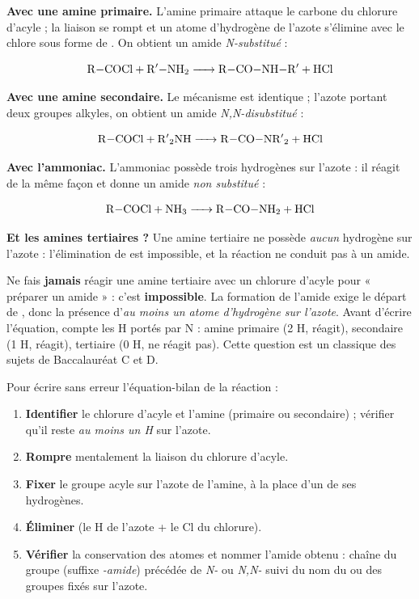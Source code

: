 \documentclass[11pt]{article}
\begin{document}
\textbf{Avec une amine primaire.} L'amine primaire  attaque le carbone du chlorure d'acyle ; la liaison  se rompt et un atome d'hydrogène de l'azote s'élimine avec le chlore sous forme de . On obtient un amide \emph{N-substitué} :

\[ \ce{R-COCl + R$'$-NH2 -> R-CO-NH-R$'$ + HCl} \]

\textbf{Avec une amine secondaire.} Le mécanisme est identique ; l'azote portant deux groupes alkyles, on obtient un amide \emph{N,N-disubstitué} :

\[ \ce{R-COCl + R$'$2NH -> R-CO-NR$'$2 + HCl} \]

\textbf{Avec l'ammoniac.} L'ammoniac  possède trois hydrogènes sur l'azote : il réagit de la même façon et donne un amide \emph{non substitué} :

\[ \ce{R-COCl + NH3 -> R-CO-NH2 + HCl} \]

\textbf{Et les amines tertiaires ?} Une amine tertiaire  ne possède \emph{aucun} hydrogène sur l'azote : l'élimination de  est impossible, et la réaction ne conduit pas à un amide.

\begin{attention}
Ne fais \textbf{jamais} réagir une amine tertiaire  avec un chlorure d'acyle pour « préparer un amide » : c'est \textbf{impossible}. La formation de l'amide exige le départ de , donc la présence d'\emph{au moins un atome d'hydrogène sur l'azote}. Avant d'écrire l'équation, compte les H portés par N : amine primaire (2 H, réagit), secondaire (1 H, réagit), tertiaire (0 H, ne réagit pas). Cette question est un classique des sujets de Baccalauréat C et D.
\end{attention}

\begin{methode}
Pour écrire sans erreur l'équation-bilan de la réaction :
\begin{enumerate}
\item \textbf{Identifier} le chlorure d'acyle  et l'amine (primaire ou secondaire) ; vérifier qu'il reste \emph{au moins un H} sur l'azote.
\item \textbf{Rompre} mentalement la liaison  du chlorure d'acyle.
\item \textbf{Fixer} le groupe acyle  sur l'azote de l'amine, à la place d'un de ses hydrogènes.
\item \textbf{Éliminer}  (le H de l'azote + le Cl du chlorure).
\item \textbf{Vérifier} la conservation des atomes et nommer l'amide obtenu : chaîne du groupe  (suffixe \emph{-amide}) précédée de \emph{N-} ou \emph{N,N-} suivi du nom du ou des groupes fixés sur l'azote.
\end{enumerate}
\end{methode}
\end{document}
